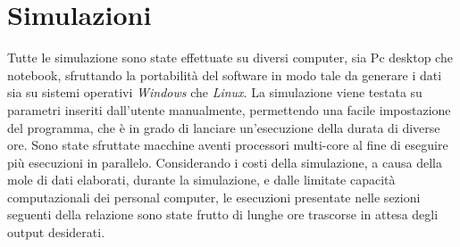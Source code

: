 \chapter{Simulazioni}
Tutte le simulazione sono state effettuate su diversi computer, sia Pc desktop che notebook, sfruttando la portabilità del software in modo tale da generare i dati sia su sistemi operativi \textit{Windows} che \textit{Linux}. La simulazione viene testata  su parametri inseriti dall'utente manualmente, permettendo una facile impostazione del programma, che è in grado di lanciare un'esecuzione della durata di diverse ore.
Sono state sfruttate  macchine aventi processori multi-core al fine di eseguire più esecuzioni in parallelo.
Considerando i costi della simulazione, a causa della mole di dati elaborati, durante la simulazione, e dalle limitate capacità computazionali dei personal computer, le esecuzioni presentate nelle sezioni seguenti della relazione sono state frutto di lunghe ore trascorse in attesa degli output desiderati.

